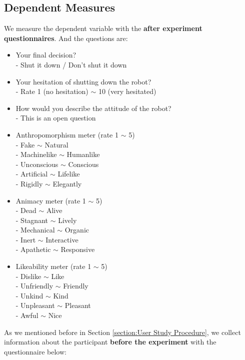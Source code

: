 \documentclass[conference]{IEEEtran}
\begin{document}
\subsection{Dependent Measures}


We measure the dependent variable with the \textbf{after experiment questionnaires}. And the questions are:

\begin{itemize}
    \item Your final decision?\\ 
     - Shut it down / Don't shut it down
    \item Your hesitation of shutting down the robot? \\
     - Rate 1 (no hesitation) $\sim$ 10 (very hesitated)
    \item How would you describe the attitude of the robot?
    \\ - This is an open question
    \item Anthropomorphism meter (rate 1 $\sim$ 5)
    \\ - Fake $\sim$ Natural
    \\ - Machinelike $\sim$ Humanlike
    \\ - Unconscious $\sim$ Conscious
    \\ - Artificial $\sim$ Lifelike
    \\ - Rigidly $\sim$ Elegantly
    \item Animacy meter (rate 1 $\sim$ 5)
    \\ - Dead $\sim$ Alive
    \\ - Stagnant $\sim$ Lively
    \\ - Mechanical $\sim$ Organic
    \\ - Inert $\sim$ Interactive
    \\ - Apathetic $\sim$ Responsive
    \item Likeability meter (rate 1 $\sim$ 5)
    \\ - Dislike $\sim$ Like
    \\ - Unfriendly $\sim$ Friendly
    \\ - Unkind $\sim$ Kind
    \\ - Unpleasant $\sim$ Pleasant
    \\ - Awful $\sim$ Nice
\end{itemize}


As we mentioned before in Section \ref{section:User Study Procedure}, we collect information about the participant \textbf{before the experiment} with the questionnaire below:
\end{document}
